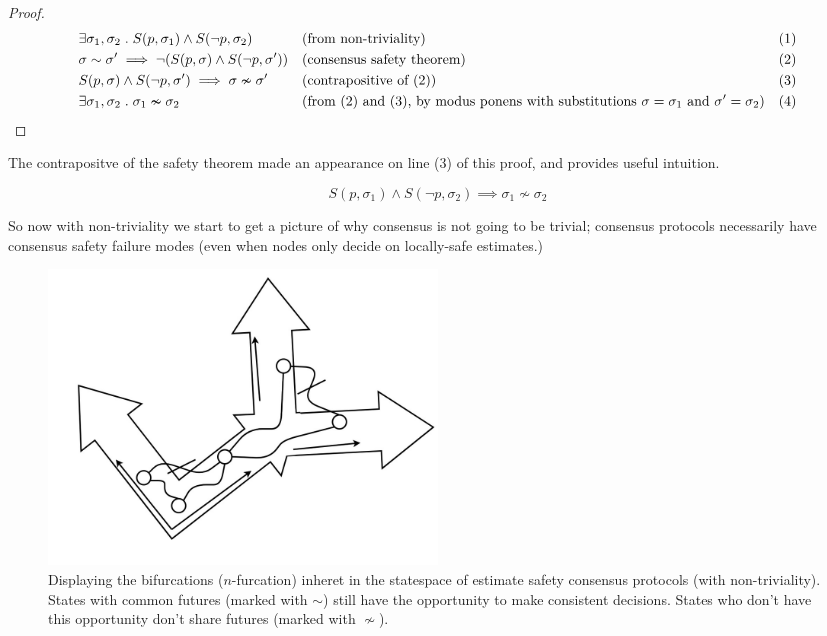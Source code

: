 \documentclass{article}
\theoremstyle{definition}
\begin{document}
\begin{proof}
\begin{align*}
  &\exists \sigma_1, \sigma_2 \hspace{1mm} . \hspace{1mm}S(p,\sigma_1) \land S(\neg{p},\sigma_2) &&\text{(from non-triviality)} &&\text{(1)}\\
  &\sigma \sim \sigma' \implies \neg(S(p,\sigma) \land S(\neg{p},\sigma')) &&\text{(consensus safety theorem)} &&\text{(2)}\\
  &S(p,\sigma) \land S(\neg{p},\sigma') \implies \sigma \nsim \sigma' &&\text{(contrapositive of (2))} &&\text{(3)}\\
  &\exists \sigma_1, \sigma_2 \hspace{1mm} . \hspace{1mm}\sigma_1 \nsim \sigma_2 \hspace{5mm} \qedhere &&\text{(from (2) and (3), by modus ponens with substitutions $\sigma=\sigma_1$ and $\sigma'=\sigma_2$)} &&\text{(4)}\\
\end{align*}
\end{proof}

The contrapositve of the safety theorem made an appearance on line (3) of this proof, and provides useful intuition.

\begin{lemma}
$$
S(p,\sigma_1) \land S(\neg{p},\sigma_2) \implies \sigma_1 \nsim \sigma_2
$$
\end{lemma}

So now with non-triviality we start to get a picture of why consensus is not going to be trivial; consensus protocols necessarily have consensus safety failure modes (even when nodes only decide on locally-safe estimates.)

\begin{figure}[!htb]
\centering
\includegraphics[width=0.5\textwidth]{sharedfutures}
\caption{Displaying the bifurcations ($n$-furcation) inheret in the statespace of estimate safety consensus protocols (with non-triviality). States with common futures (marked with $\sim$) still have the opportunity to make consistent decisions. States who don't have this opportunity don't share futures (marked with $\nsim$).}
\end{figure}
\end{document}
